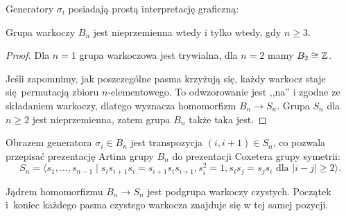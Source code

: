 Generatory $\sigma_i$ posiadają prostą interpretację graficzną:
\begin{comment}
\[
    \begin{tikzpicture}[baseline=-0.65ex, scale=0.05]
    \useasboundingbox (-15, -10) rectangle (15, 15);
    \begin{knot}[clip width=5, end tolerance=1pt]
        \strand[semithick] (-15, -10) to (-15, 10);
        \strand[semithick] ( 15, -10) to ( 15, 10);
        \strand[semithick] (-5, -10) to (-5, -5) .. controls (-5, 1) and (5, -1) .. (5, 5) to (5, 10);
        \strand[semithick] (-5, 10) to (-5, 5) .. controls (-5, -1) and (5, 1) .. (5, -5) to (5, -10);
        \node  at (-10, 0) {\ldots};
        \node at ( 10, 0) {\ldots};
        \node [above] at (-15, 12) {$1$};
        \node [above] at ( -5, 12) {$i$};
        \node [above] at (  5, 12) {$i+1$};
        \node [above] at ( 15, 12) {$n$};
    \end{knot}
    \end{tikzpicture}
\]
\end{comment}

\begin{proposition}
    Grupa warkoczy $B_n$ jest nieprzemienna wtedy i tylko wtedy, gdy $n \ge 3$.
\end{proposition}

\begin{proof}
    Dla $n = 1$ grupa warkoczowa jest trywialna, dla $n = 2$ mamy $B_2 \cong \mathbb Z$.

    Jeśli zapomnimy, jak poszczególne pasma krzyżują się, każdy warkocz staje się permutacją zbioru $n$-elementowego.
    To odwzorowanie jest ,,na'' i zgodne ze składaniem warkoczy, dlatego wyznacza homomorfizm $B_n \to S_n$.
    Grupa $S_n$ dla $n \ge 2$ jest nieprzemienna, zatem grupa $B_n$ także taka jest.
\end{proof}

Obrazem generatora $\sigma_i \in B_n$ jest transpozycja $(i, i+1) \in S_n$, co pozwala przepisać prezentację Artina grupy $B_n$ do prezentacji Coxetera grupy symetrii:
\begin{equation}
    S_n = \langle s_1, \ldots, s_{n-1} \mid s_{i}s_{i+1}s_{i} = s_{i+1}s_{i}s_{i+1}, s_i^2 = 1, s_is_j=s_js_i \mbox { dla } |i-j| \ge 2\rangle.
\end{equation}

Jądrem homomorfizmu $B_n \to S_n$ jest podgrupa warkoczy czystych.
Początek i~koniec każdego pasma czystego warkocza znajduje się w tej samej pozycji.

